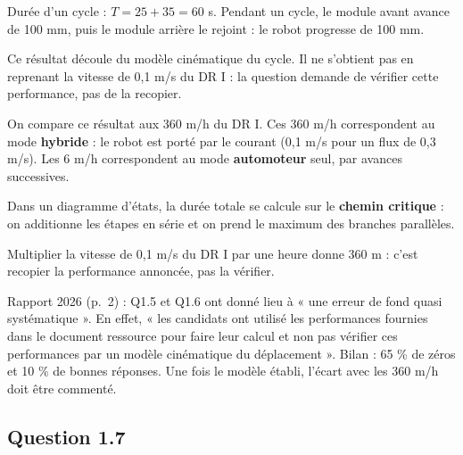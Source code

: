 \documentclass[11pt,a4paper]{article}
\newcommand{\equationajustee}[1]{%
  \sbox{\boiteequation}{$\displaystyle #1$}%
  \ifdim\wd\boiteequation>\linewidth
    \[\resizebox{\linewidth}{!}{\usebox{\boiteequation}}\]%
  \else
    \[#1\]%
  \fi}
\begin{document}
Durée d'un cycle : \(T = 25 + 35 = 60\) s. Pendant un cycle, le module avant avance de 100 mm, puis le module arrière le rejoint : le robot progresse de 100 mm.

\equationajustee{\begin{aligned}
D &= \frac{3600}{60}\times 0{,}1\ \text{m} \\
&= 6\ \text{m}
\end{aligned}}

\equationajustee{\boxed{D = 6\ \text{m en 1 h}}}

Ce résultat découle du modèle cinématique du cycle. Il ne s'obtient pas en reprenant la vitesse de 0,1 m/s du DR I : la question demande de vérifier cette performance, pas de la recopier.

On compare ce résultat aux 360 m/h du DR I. Ces 360 m/h correspondent au mode \textbf{hybride} : le robot est porté par le courant (0,1 m/s pour un flux de 0,3 m/s). Les 6 m/h correspondent au mode \textbf{automoteur} seul, par avances successives.

\begin{methode}

Dans un diagramme d'états, la durée totale se calcule sur le \textbf{chemin critique} : on additionne les étapes en série et on prend le maximum des branches parallèles.

\end{methode}

\begin{piege}

Multiplier la vitesse de 0,1 m/s du DR I par une heure donne 360 m : c'est recopier la performance annoncée, pas la vérifier.

\end{piege}

\begin{jury}

Rapport 2026 (p.~2) : Q1.5 et Q1.6 ont donné lieu à « une erreur de fond quasi systématique ». En effet, « les candidats ont utilisé les performances fournies dans le document ressource pour faire leur calcul et non pas vérifier ces performances par un modèle cinématique du déplacement ». Bilan : 65 \% de zéros et 10 \% de bonnes réponses. Une fois le modèle établi, l'écart avec les 360 m/h doit être commenté.

\end{jury}

\hypertarget{question-1.7}{%
\subsection{Question 1.7}\label{question-1.7}}
\end{document}
